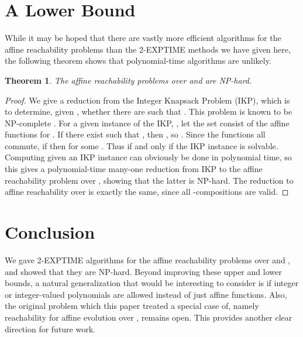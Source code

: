 \documentclass[11pt]{amsart}
\newtheorem{theorem}{Theorem}
\theoremstyle{definition}
\theoremstyle{remark}
\begin{document}
\section{A Lower Bound} \label{lower-bound}

While it may be hoped that there are vastly more efficient algorithms for the affine reachability problems than the \textsf{2-EXPTIME} methods we have given here, the following theorem shows that polynomial-time algorithms are unlikely.

\begin{theorem}
The affine reachability problems over  and  are \textsf{NP}-hard.
\end{theorem}
\begin{proof}
We give a reduction from the Integer Knapsack Problem (IKP), which is to determine, given , whether there are  such that . This problem is known to be \textsf{NP}-complete \cite{lueker}. For a given instance of the IKP, , let the set  consist of the affine functions  for . If there exist  such that , then , so . Since the functions  all commute, if  then  for some . Thus  if and only if the IKP instance is solvable. Computing  given an IKP instance can obviously be done in polynomial time, so this gives a polynomial-time many-one reduction from IKP to the affine reachability problem over , showing that the latter is \textsf{NP}-hard. The reduction to affine reachability over  is exactly the same, since all -compositions are valid.
\end{proof}

\section{Conclusion}

We gave \textsf{2-EXPTIME} algorithms for the affine reachability problems over  and , and showed that they are \textsf{NP}-hard. Beyond improving these upper and lower bounds, a natural generalization that would be interesting to consider is if integer or integer-valued polynomials are allowed instead of just affine functions. Also, the original problem which this paper treated a special case of, namely reachability for affine evolution over , remains open. This provides another clear direction for future work.



\end{document}

